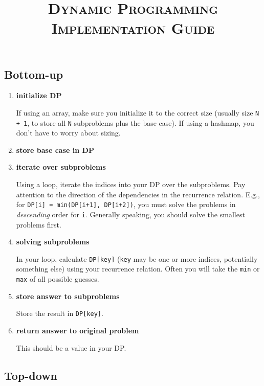 \documentclass{article}
\title{\large{\textsc{\vspace{-1cm}Dynamic Programming Implementation Guide}}}
\date{}
\begin{document}
\maketitle

\subsection*{Bottom-up}

\begin{enumerate}
    \item \textbf{initialize DP}
    
If using an array, make sure you initialize it to the correct size (usually size \texttt{N + 1}, to store all \texttt{N} subproblems plus the base case). If using a hashmap, you don't have to worry about sizing.

    \item \textbf{store base case in DP}
    
    \item \textbf{iterate over subproblems}
    
Using a loop, iterate the indices into your DP over the subproblems. Pay attention to the direction of the dependencies in the recurrence relation. E.g., for \texttt{DP[i] = min(DP[i+1], DP[i+2])}, you must solve the problems in \textit{descending} order for \texttt{i}. Generally speaking, you should solve the smallest problems first.
    
    \item \textbf{solving subproblems}
    
    In your loop, calculate \texttt{DP[key]} (\texttt{key} may be one or more indices, potentially something else) using your recurrence relation. Often you will take the \texttt{min} or \texttt{max} of all possible guesses.
    
    \item \textbf{store answer to subproblems}
    
    Store the result in \texttt{DP[key]}.
    
    \item \textbf{return answer to original problem}
    
    This should be a value in your DP.
    
\end{enumerate}

\subsection*{Top-down}
\end{document}
